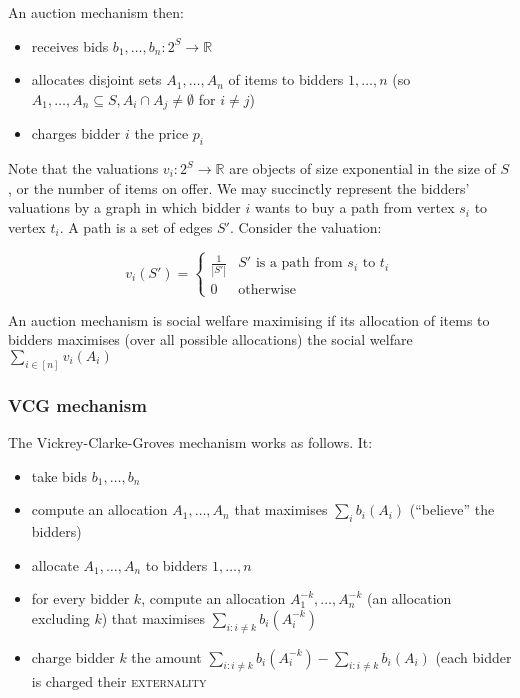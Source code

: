 An auction mechanism then:

\begin{itemize}
	\itemsep0em
	\item receives bids $b_1, \ldots, b_n : 2^S \rightarrow \mathbb{R}$
	\item allocates disjoint sets $A_1, \ldots, A_n$ of items to
		bidders $1, \ldots, n$ (so $A_1, \ldots, A_n \subseteq S, A_i
		\cap A_j \neq \emptyset$ for $i \neq j$)
	\item charges bidder $i$ the price $p_i$
\end{itemize}

Note that the valuations $v_i : 2^S \rightarrow \mathbb{R}$ are objects of size
exponential in the size of $S$, or the number of items on offer.  We may
succinctly represent the bidders' valuations by a graph in which bidder $i$
wants to buy a path from vertex $s_i$ to vertex $t_i$. A path is a set of edges
$S'$. Consider the valuation:

\begin{equation*}
	v_i(S') = \begin{cases}
		\frac{1}{|S'|} & \text{$S'$ is a path from $s_i$ to $t_i$} \\
		0 & \text{otherwise}
	\end{cases}
\end{equation*}

\begin{definition}
	An auction mechanism is social welfare maximising if its allocation of
	items to bidders maximises (over all possible allocations) the social
	welfare $\sum_{i \in [n]} v_i(A_i)$
\end{definition}

\subsubsection{VCG mechanism}

The Vickrey-Clarke-Groves mechanism works as follows. It:

\begin{itemize}
	\item take bids $b_1, \ldots, b_n$
	\item compute an allocation $A_1, \ldots, A_n$ that maximises
		$\sum_i b_i(A_i)$ (``believe'' the bidders)
	\item allocate $A_1, \ldots, A_n$ to bidders $1, \ldots, n$
	\item for every bidder $k$, compute an allocation $A_1^{-k},
		\ldots, A_n^{-k}$ (an allocation excluding $k$) that
		maximises $\sum_{i: i \neq k} b_i(A_i^{-k})$
	\item charge bidder $k$ the amount $\sum_{i: i \neq k}
		b_i(A_i^{-k}) - \sum_{i: i \neq k} b_i(A_i)$ (each bidder
		is charged their \textsc{externality}
\end{itemize}

